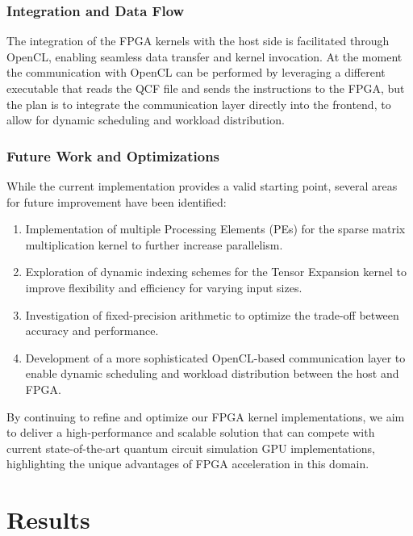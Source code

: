 \documentclass[12pt,oneside,a4paper]{article}
\begin{document}
\subsubsection{Integration and Data Flow}

The integration of the FPGA kernels with the host side is facilitated through OpenCL, enabling seamless data transfer and kernel invocation. At the moment the communication with OpenCL can be performed by leveraging a different executable that reads the QCF file and sends the instructions to the FPGA, but the plan is to integrate the communication layer directly into the frontend, to allow for dynamic scheduling and workload distribution.

\subsubsection{Future Work and Optimizations}

While the current implementation provides a valid starting point, several areas for future improvement have been identified:

\begin{enumerate}
    \item Implementation of multiple Processing Elements (PEs) for the sparse matrix multiplication kernel to further increase parallelism.
    \item Exploration of dynamic indexing schemes for the Tensor Expansion kernel to improve flexibility and efficiency for varying input sizes.
    \item Investigation of fixed-precision arithmetic to optimize the trade-off between accuracy and performance.
    \item Development of a more sophisticated OpenCL-based communication layer to enable dynamic scheduling and workload distribution between the host and FPGA.
\end{enumerate}

By continuing to refine and optimize our FPGA kernel implementations, we aim to deliver a high-performance and scalable solution that can compete with current state-of-the-art quantum circuit simulation GPU implementations, highlighting the unique advantages of FPGA acceleration in this domain.


\section{Results}
\label{sec:results}
\end{document}
